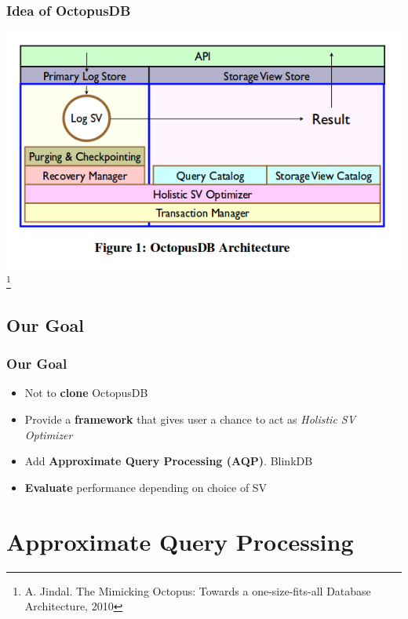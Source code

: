 \documentclass{beamer}
\begin{document}
\begin{frame}
\frametitle{Idea of OctopusDB}
\includegraphics[scale=0.5]{img/octopus_arch.png}
\footnote{A. Jindal. The Mimicking Octopus: Towards a one-size-fits-all Database Architecture, 2010}
\end{frame}

\subsection{Our Goal}
\begin{frame}
\frametitle{Our Goal}
\begin{itemize}
\item{Not to \textbf{clone} OctopusDB} \pause
\item{Provide a \textbf{framework} that gives user a chance to act as \textit{Holistic SV Optimizer}} \pause
\item{Add \textbf{Approximate Query Processing (AQP)}. BlinkDB}
\pause
\item{\textbf{Evaluate} performance depending on choice of SV}
\end{itemize}
\end{frame}

\section{Approximate Query Processing}
\end{document}
